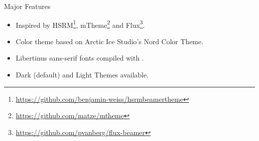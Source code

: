 \documentclass[\string~/GitHub/sthlmNordBeamerTheme/sthlmNordLightDemo.tex]{subfiles}
\begin{document}
\begin{frame}[c,fragile]{Major Features}

	\begin{itemize}
		\item Inspired by HSRM\footnote{\url{https://github.com/benjamin-weiss/hsrmbeamertheme}},
		      mTheme\footnote{\url{https://github.com/matze/mtheme}} and
		      Flux\footnote{\url{https://github.com/pvanberg/flux-beamer}}.
		\item Color theme based on Arctic Ice Studio's Nord Color Theme.
		\item Libertinus sans-serif fonts compiled with \XeLaTeX.
		\item Dark (default) and Light Themes available.
	\end{itemize}

\end{frame}
\end{document}
